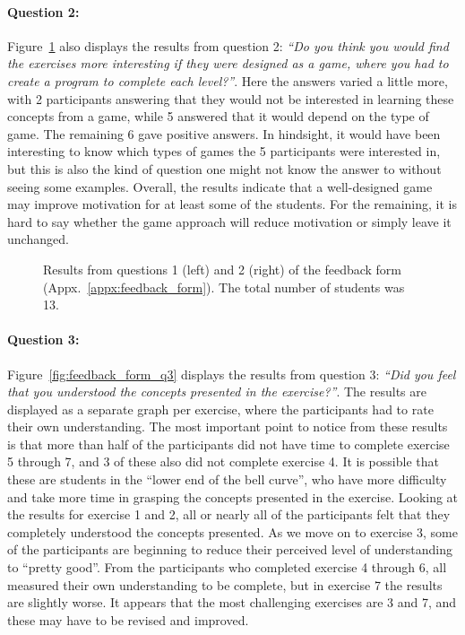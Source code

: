 \paragraph{Question 2:} Figure~\ref{fig:feedback_form_q12} also displays the results from question 2: \emph{``Do you think you would find the exercises more interesting if they were designed as a game, where you had to create a program to complete each level?''}. Here the answers varied a little more, with 2 participants answering that they would not be interested in learning these concepts from a game, while 5 answered that it would depend on the type of game. The remaining 6 gave positive answers. In hindsight, it would have been interesting to know which types of games the 5 participants were interested in, but this is also the kind of question one might not know the answer to without seeing some examples. Overall, the results indicate that a well-designed game may improve motivation for at least some of the students. For the remaining, it is hard to say whether the game approach will reduce motivation or simply leave it unchanged.

\begin{figure}[htp]
	\caption[Results from feedback form questions 1 and 2]{Results from questions 1 (left) and 2 (right) of the feedback form (Appx.~\ref{appx:feedback_form}). The total number of students was 13.}
	\label{fig:feedback_form_q12}
\end{figure}

\paragraph{Question 3:} Figure~\ref{fig:feedback_form_q3} displays the results from question 3: \emph{``Did you feel that you understood the concepts presented in the exercise?''}. The results are displayed as a separate graph per exercise, where the participants had to rate their own understanding. The most important point to notice from these results is that more than half of the participants did not have time to complete exercise 5 through 7, and 3 of these also did not complete exercise 4. It is possible that these are students in the ``lower end of the bell curve'', who have more difficulty and take more time in grasping the concepts presented in the exercise. Looking at the results for exercise 1 and 2, all or nearly all of the participants felt that they completely understood the concepts presented. As we move on to exercise 3, some of the participants are beginning to reduce their perceived level of understanding to ``pretty good''. From the participants who completed exercise 4 through 6, all measured their own understanding to be complete, but in exercise 7 the results are slightly worse. It appears that the most challenging exercises are 3 and 7, and these may have to be revised and improved.

